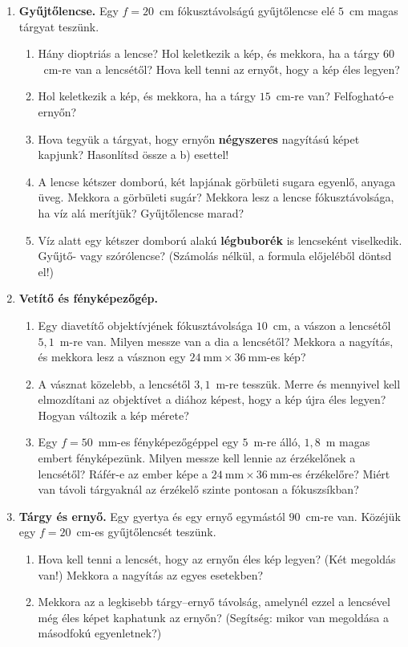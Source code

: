 \documentclass[12pt]{article}
\begin{document}
\newpage
\begin{enumerate}[start=5]
\item \textbf{Gyűjtőlencse.} Egy $f = 20$~cm fókusztávolságú gyűjtőlencse elé $5$~cm magas
  tárgyat teszünk.
  \begin{enumerate}
    \item Hány dioptriás a lencse? Hol keletkezik a kép, és mekkora, ha a tárgy $60$~cm-re
      van a lencsétől? Hova kell tenni az ernyőt, hogy a kép éles legyen?
    \item Hol keletkezik a kép, és mekkora, ha a tárgy $15$~cm-re van? Felfogható-e ernyőn?
    \item Hova tegyük a tárgyat, hogy ernyőn \textbf{négyszeres} nagyítású képet kapjunk?
      Hasonlítsd össze a b) esettel!
    \item A lencse kétszer domború, két lapjának görbületi sugara egyenlő, anyaga üveg.
      Mekkora a görbületi sugár? Mekkora lesz a lencse fókusztávolsága, ha víz alá
      merítjük? Gyűjtőlencse marad?
    \item Víz alatt egy kétszer domború alakú \textbf{légbuborék} is lencseként viselkedik.
      Gyűjtő- vagy szórólencse? (Számolás nélkül, a formula előjeléből döntsd el!)
  \end{enumerate}

\item \textbf{Vetítő és fényképezőgép.}
  \begin{enumerate}
    \item Egy diavetítő objektívjének fókusztávolsága $10$~cm, a vászon a lencsétől $5{,}1$~m-re
      van. Milyen messze van a dia a lencsétől? Mekkora a nagyítás, és mekkora lesz a
      vásznon egy $24~\text{mm} \times 36~\text{mm}$-es kép?
    \item A vásznat közelebb, a lencsétől $3{,}1$~m-re tesszük. Merre és mennyivel kell
      elmozdítani az objektívet a diához képest, hogy a kép újra éles legyen? Hogyan
      változik a kép mérete?
    \item Egy $f = 50$~mm-es fényképezőgéppel egy $5$~m-re álló, $1{,}8$~m magas embert
      fényképezünk. Milyen messze kell lennie az érzékelőnek a lencsétől? Ráfér-e az ember
      képe a $24~\text{mm} \times 36~\text{mm}$-es érzékelőre? Miért van távoli tárgyaknál az
      érzékelő szinte pontosan a fókuszsíkban?
  \end{enumerate}

\item \textbf{Tárgy és ernyő.} Egy gyertya és egy ernyő egymástól $90$~cm-re van. Közéjük
  egy $f = 20$~cm-es gyűjtőlencsét teszünk.
  \begin{enumerate}
    \item Hova kell tenni a lencsét, hogy az ernyőn éles kép legyen? (Két megoldás van!)
      Mekkora a nagyítás az egyes esetekben?
    \item Mekkora az a legkisebb tárgy--ernyő távolság, amelynél ezzel a lencsével még éles
      képet kaphatunk az ernyőn? (Segítség: mikor van megoldása a másodfokú egyenletnek?)
  \end{enumerate}
\end{enumerate}
\end{document}
